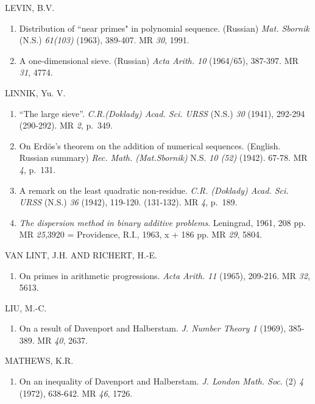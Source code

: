 \begin{thebibliography}{99}
 LEVIN, B.V.\pageoriginale
\begin{enumerate}
\item Distribution of ``near primes" in polynomial sequence. (Russian)
  \textit{Mat. Sbornik} (N.S.) {\em 61(103)} (1963), 389-407. MR {\em
    30}, 1991. 

\item A one-dimensional sieve. (Russian) \textit{Acta
  Arith. 10} (1964/65), 387-397. MR {\em 31}, 4774. 
\end{enumerate}

 LINNIK, Yu. V.
\begin{enumerate}
\item ``The large sieve''. \textit{C.R.(Doklady) Acad. Sci. URSS}
  (N.S.) {\em 30} (1941), 292-294 (290-292). MR {\em 2}, p.~349.

\item On Erd\"os's theorem on the addition of numerical
  sequences. (English. Russian summary)
  \textit{Rec. Math. (Mat.Sbornik)} N.S. {\em 10 (52)} (1942). 67-78. MR
  {\em 4}, p.~131. 

\item A remark on the least quadratic
  non-residue. \textit{C.R. (Doklady) Acad. Sci. URSS} (N.S.)
  {\em 36} (1942), 119-120. (131-132). MR {\em 4}, p.~189. 

\item \textit{The dispersion method in binary additive
  problems}. Leningrad, 1961, 208 pp. MR {\em 25},3920 = Providence,
  R.I., 1963, x + 186 pp. MR {\em 29}, 5804. 
\end{enumerate}

 VAN LINT, J.H. AND RICHERT, H.-E.
\begin{enumerate}
\item On primes in arithmetic progressions. \textit{Acta Arith. 11}
  (1965), 209-216. MR {\em 32}, 5613.
\end{enumerate}

 LIU, M.-C.
\begin{enumerate}
\item On a result of Davenport and Halberstam. \textit{J. Number
  Theory 1} (1969), 385-389. MR {\em 40}, 2637.
\end{enumerate}

 MATHEWS, K.R.
\begin{enumerate}
\item On an inequality of Davenport and Halberstam. \textit{J. London
  Math. Soc}. (2) {\em 4} (1972), 638-642. MR {\em 46}, 1726.


\end{enumerate}
\end{thebibliography}
